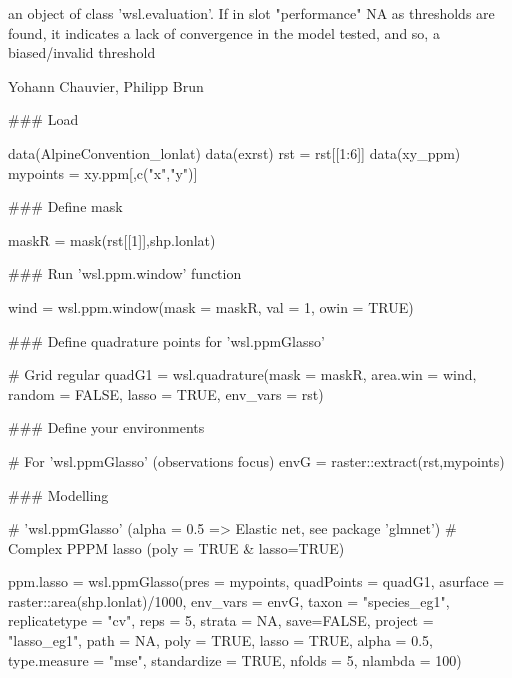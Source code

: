 \documentclass[a4paper]{book}
\begin{document}
%
\begin{Value}
an object of class 'wsl.evaluation'. If in slot "performance" NA as thresholds are found,
it indicates a lack of convergence in the model tested, and so, a biased/invalid threshold
\end{Value}
%
\begin{Author}\relax
Yohann Chauvier, Philipp Brun
\end{Author}
%
\begin{Examples}
\begin{ExampleCode}


### Load

data(AlpineConvention_lonlat)
data(exrst)
rst = rst[[1:6]]
data(xy_ppm)
mypoints = xy.ppm[,c("x","y")]

### Define mask

maskR = mask(rst[[1]],shp.lonlat)

### Run 'wsl.ppm.window' function

wind = wsl.ppm.window(mask = maskR,
                      val = 1,
                      owin = TRUE)

### Define quadrature points for 'wsl.ppmGlasso'

   # Grid regular
quadG1 = wsl.quadrature(mask = maskR,
                        area.win = wind,
                        random = FALSE,
                        lasso = TRUE,
                        env_vars = rst)

### Define your environments

   # For 'wsl.ppmGlasso' (observations focus)
envG = raster::extract(rst,mypoints)

### Modelling

   # 'wsl.ppmGlasso' (alpha = 0.5 => Elastic net, see package 'glmnet')
       # Complex PPPM lasso (poly = TRUE & lasso=TRUE)

ppm.lasso = wsl.ppmGlasso(pres = mypoints,
                       quadPoints = quadG1,
                       asurface = raster::area(shp.lonlat)/1000,
                       env_vars = envG,
                       taxon = "species_eg1",
                       replicatetype = "cv",
                       reps = 5,
                       strata = NA,
                       save=FALSE,
                       project = "lasso_eg1",
                       path = NA,
                       poly = TRUE,
                       lasso = TRUE,
                       alpha = 0.5,
                       type.measure = "mse",
                       standardize = TRUE,
                       nfolds = 5,
                       nlambda = 100)


\end{ExampleCode}
\end{Examples}
\end{document}
